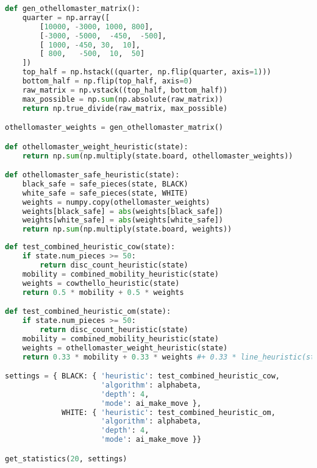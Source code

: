 \begin{lstlisting}[language=Python]
def gen_othellomaster_matrix():
    quarter = np.array([
        [10000, -3000, 1000, 800],
        [-3000, -5000,  -450,  -500],
        [ 1000, -450, 30,  10],
        [ 800,   -500,  10,  50]
    ])
    top_half = np.hstack((quarter, np.flip(quarter, axis=1)))
    bottom_half = np.flip(top_half, axis=0)
    raw_matrix = np.vstack((top_half, bottom_half))
    max_possible = np.sum(np.absolute(raw_matrix))
    return np.true_divide(raw_matrix, max_possible)

othellomaster_weights = gen_othellomaster_matrix()

def othellomaster_weight_heuristic(state):
    return np.sum(np.multiply(state.board, othellomaster_weights))

def othellomaster_safe_heuristic(state):
    black_safe = safe_pieces(state, BLACK)
    white_safe = safe_pieces(state, WHITE)
    weights = numpy.copy(othellomaster_weights)
    weights[black_safe] = abs(weights[black_safe])
    weights[white_safe] = abs(weights[white_safe])
    return np.sum(np.multiply(state.board, weights))
\end{lstlisting}

\begin{lstlisting}[language=Python]
def test_combined_heuristic_cow(state):
    if state.num_pieces >= 50:
        return disc_count_heuristic(state)
    mobility = combined_mobility_heuristic(state)
    weights = cowthello_heuristic(state)
    return 0.5 * mobility + 0.5 * weights

def test_combined_heuristic_om(state):
    if state.num_pieces >= 50:
        return disc_count_heuristic(state)
    mobility = combined_mobility_heuristic(state)
    weights = othellomaster_weight_heuristic(state)
    return 0.33 * mobility + 0.33 * weights #+ 0.33 * line_heuristic(state)

settings = { BLACK: { 'heuristic': test_combined_heuristic_cow,
                      'algorithm': alphabeta,
                      'depth': 4,
                      'mode': ai_make_move },
             WHITE: { 'heuristic': test_combined_heuristic_om,
                      'algorithm': alphabeta,
                      'depth': 4,
                      'mode': ai_make_move }}

get_statistics(20, settings)
\end{lstlisting}
